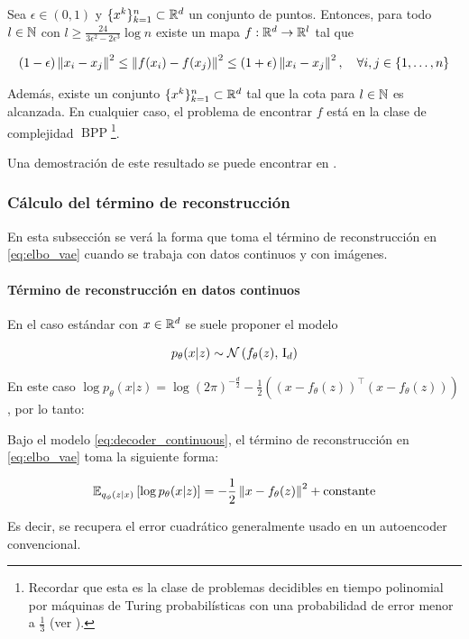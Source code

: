 \begin{teo}
    Sea $\epsilon\in (0,1)$ y $\{x^k\}_{k=1}^n\subset\mathbb{R}^d$ un conjunto de puntos. Entonces, para todo $l\in\mathbb{N}$ con $l\geq\frac{24}{3\epsilon^2 - 2\epsilon^3} \log n$ existe un mapa $f:\mathbb{R}^d\to\mathbb{R}^l$ tal que

    \begin{equation}
        \label{eq:johnson_indenstrauss}
        (1-\epsilon)\left\lVert x_i-x_j \right\rVert^2 \leq \left\lVert f(x_i)-f(x_j) \right\rVert^2 \leq (1+\epsilon)\left\lVert x_i-x_j \right\rVert^2, \quad\forall i,j\in\{1,\ldots,n\}
    \end{equation}

    Además, existe un conjunto $\{x^k\}_{k=1}^n\subset\mathbb{R}^d$ tal que la cota para $l\in\mathbb{N}$ es alcanzada. En cualquier caso, el problema de encontrar $f$ está en la clase de complejidad $\operatorname{BPP}$\footnote{Recordar que esta es la clase de problemas decidibles en tiempo polinomial por máquinas de Turing probabilísticas con una probabilidad de error menor a $\frac{1}{3}$ (ver \cite{arora2009computational}).}.
\end{teo}

Una demostración de este resultado se puede encontrar en \cite{dasgupta2003elementary}.

\subsubsection{Cálculo del término de reconstrucción}

En esta subsección se verá la forma que toma el término de reconstrucción en \eqref{eq:elbo_vae} cuando se trabaja con datos continuos y con imágenes.

\paragraph{Término de reconstrucción en datos continuos}

En el caso estándar con $x\in\mathbb{R}^d$ se suele proponer el modelo

\begin{equation}
	p_\theta(x|z)\sim\mathcal{N}\left(f_\theta(z),\,\operatorname{I}_{d}\right)
	\label{eq:decoder_continuous}
\end{equation}

En este caso $\log p_\theta(x|z) = \log (2\pi)^{-\frac{d}{2}} - \frac{1}{2}\left((x-f_\theta(z))^\top (x-f_\theta(z))\right)$, por lo tanto:

\begin{prop}
	Bajo el modelo \eqref{eq:decoder_continuous}, el término de reconstrucción en \eqref{eq:elbo_vae} toma la siguiente forma:

	\begin{equation}
		\mathbb{E}_{q_\phi(z|x)}\left[\log p_\theta(x|z)\right] = -\frac{1}{2} \left\lVert x-f_\theta(z) \right\rVert^2 + \operatorname{constante}
	\end{equation}

	Es decir, se recupera el error cuadrático generalmente usado en un autoencoder convencional.
\end{prop}

